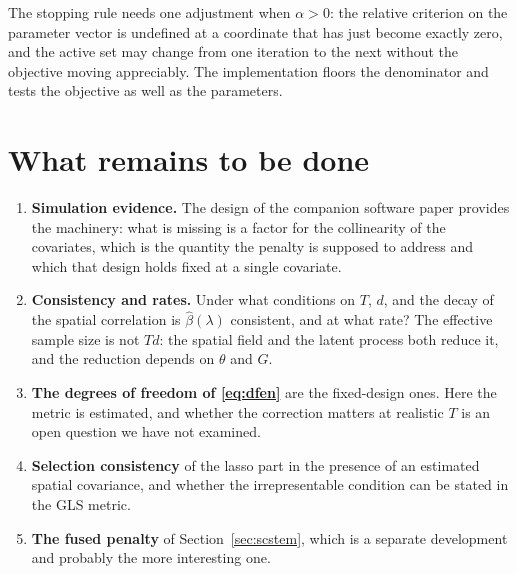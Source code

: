 \documentclass[11pt,a4paper]{article}
\begin{document}
The stopping rule needs one adjustment when $\alpha > 0$: the relative criterion
on the parameter vector is undefined at a coordinate that has just become
exactly zero, and the active set may change from one iteration to the next
without the objective moving appreciably. The implementation floors the
denominator and tests the objective as well as the parameters.

\section{What remains to be done}

\begin{enumerate}
\item \textbf{Simulation evidence.} The design of the companion software paper
provides the machinery: what is missing is a factor for the collinearity of the
covariates, which is the quantity the penalty is supposed to address and which
that design holds fixed at a single covariate.
\item \textbf{Consistency and rates.} Under what conditions on $T$, $d$, and the
decay of the spatial correlation is $\hat\beta(\lambda)$ consistent, and at what
rate? The effective sample size is not $Td$: the spatial field and the latent
process both reduce it, and the reduction depends on $\theta$ and $G$.
\item \textbf{The degrees of freedom of \eqref{eq:dfen}} are the fixed-design
ones. Here the metric is estimated, and whether the correction matters at
realistic $T$ is an open question we have not examined.
\item \textbf{Selection consistency} of the lasso part in the presence of an
estimated spatial covariance, and whether the irrepresentable condition can be
stated in the GLS metric.
\item \textbf{The fused penalty} of Section~\ref{sec:scstem}, which is a
separate development and probably the more interesting one.
\end{enumerate}
\end{document}
